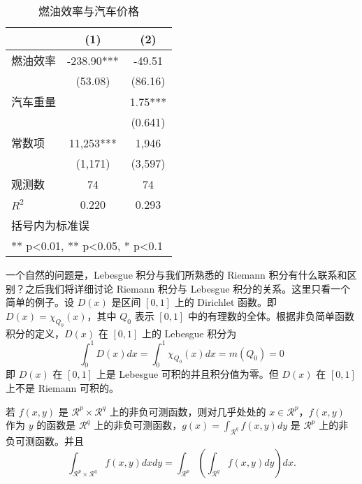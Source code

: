 \documentclass[cn,normal,11pt]{../elegantnote}
\begin{document}
\begin{table}[htbp]
  \small
  \centering
  \caption{燃油效率与汽车价格}
    \begin{tabular}{lcc}
    \toprule
                    &       (1)         &        (2)      \\
    \midrule
    燃油效率        &    -238.90***     &      -49.51     \\
                    &     (53.08)       &      (86.16)    \\
    汽车重量        &                   &        1.75***  \\
                    &                   &       (0.641)   \\
    常数项          &  11,253***        &    1,946       \\
                    &  (1,171)          &   (3,597)      \\
    观测数          &      74           &       74        \\
    $R^2$           &       0.220       &        0.293    \\
    \bottomrule
    \multicolumn{3}{l}{\scriptsize 括号内为标准误} \\
    \multicolumn{3}{l}{\scriptsize *** p<0.01, ** p<0.05, * p<0.1} \\
    \end{tabular}%
  \label{tab:reg}%
\end{table}%

一个自然的问题是，Lebesgue 积分与我们所熟悉的 Riemann 积分有什么联系和区别？之后我们将详细讨论 Riemann 积分与 Lebesgue 积分的关系。这里只看一个简单的例子。设 $D(x)$ 是区间 $[0,1]$ 上的 Dirichlet 函数。即 $D(x)=\chi_{Q_0}(x)$，其中 $Q_0$ 表示 $[0,1]$ 中的有理数的全体。根据非负简单函数积分的定义，$D(x)$ 在 $[0,1]$ 上的 Lebesgue 积分为
\begin{equation}
   \label{inter2}
   \int_0^1 D(x)dx = \int_0^1 \chi_{Q_0} (x) dx = m(Q_0) = 0
\end{equation}
即 $D(x)$ 在 $[0,1]$ 上是 Lebesgue 可积的并且积分值为零。但 $D(x)$ 在 $[0,1]$ 上不是 Riemann 可积的。

\begin{theorem}[Fubini 定理]\label{thm:fubi}
若 $f(x,y)$ 是 $\mathcal{R}^p\times\mathcal{R}^q$ 上的非负可测函数，则对几乎处处的 $x\in \mathcal{R}^p$，$f(x,y)$ 作为 $y$ 的函数是 $\mathcal{R}^q$ 上的非负可测函数，$g(x)=\int_{\mathcal{R}^q}f(x,y) dy$ 是 $\mathcal{R}^p$ 上的非负可测函数。并且
\begin{equation}
   \label{eq:461}
   \int_{\mathcal{R}^p\times\mathcal{R}^q} f(x,y) dxdy=\int_{\mathcal{R}^p}\left(\int_{\mathcal{R}^q}f(x,y)dy\right)dx.
\end{equation}
\end{theorem}
\end{document}

